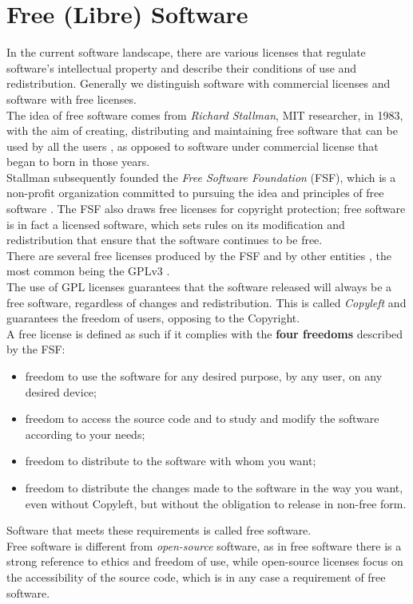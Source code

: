 
\chapter{Free (Libre) Software} %

\label{Capitolo1} %

In the current software landscape, there are various licenses that regulate software's intellectual property and describe their conditions of use and redistribution. Generally we distinguish software with commercial licenses and software with free licenses. \\
The idea of free software comes from \emph{Richard Stallman}, MIT researcher, in 1983, with the aim of creating, distributing and maintaining free software that can be used by all the users \parencite{Reference57}, as opposed to software under commercial license that began to born in those years.\\
Stallman subsequently founded the \emph{Free Software Foundation} (FSF), which is a non-profit organization committed to pursuing the idea and principles of free software \parencite{Reference58}. The FSF also draws free licenses for copyright protection; free software is in fact a licensed software, which sets rules on its modification and redistribution that ensure that the software continues to be free. \\ There are several free licenses produced by the FSF \parencite{Reference59} and by other entities \parencite{Reference60}, the most common being the GPLv3 \parencite{Reference61}.\\
The use of GPL licenses guarantees that the software released will always be a free software, regardless of changes and redistribution. This is called \emph{Copyleft} and guarantees the freedom of users, opposing to the Copyright.\\
A free license is defined as such if it complies with the \textbf{four freedoms} described by the FSF: \\
\begin{itemize}
\item freedom to use the software for any desired purpose, by any user, on any desired device;
\item freedom to access the source code and to study and modify the software according to your needs;
\item freedom to distribute to the software with whom you want;
\item freedom to distribute the changes made to the software in the way you want, even without Copyleft, but without the obligation to release in non-free form.
\end{itemize}
Software that meets these requirements is called free software. \\
Free software is different from \emph{open-source} software, as in free software there is a strong reference to ethics and freedom of use, while open-source licenses focus on the accessibility of the source code, which is in any case a requirement of free software.

